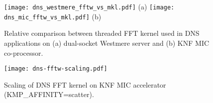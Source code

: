 






\begin{figure}
\begin{center}
\texttt{[image: dns\_westmere\_fftw\_vs\_mkl.pdf]}
(a)
\texttt{[image: dns\_mic\_fftw\_vs\_mkl.pdf]} 
(b)
\end{center}
\vspace*{-.5cm}
\caption{Relative comparison between threaded FFT kernel
  used in DNS applications on (a) dual-socket Westmere server and (b)
  KNF MIC co-processor.}
\label{fig:mkl-vs-fftw}
\end{figure}

\begin{figure}
\begin{center}
\texttt{[image: dns-fftw-scaling.pdf]}
\end{center}
\vspace*{-.5cm}
\caption{Scaling of DNS FFT kernel on KNF MIC accelerator ({KMP\_AFFINITY=scatter}).}
\label{fig:dns_scaling}
\end{figure}

